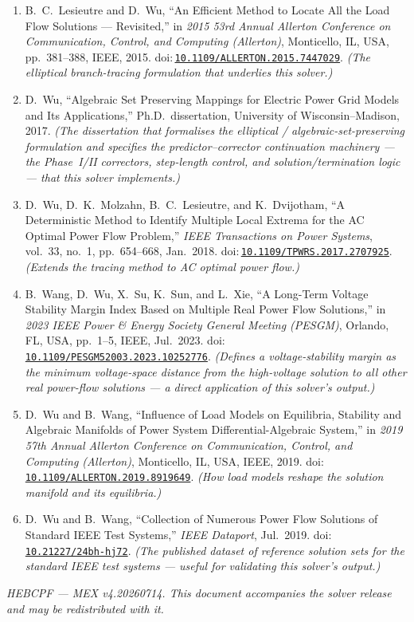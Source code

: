 \documentclass[11pt,a4paper]{article}
\newcommand{\doi}[1]{\href{https://doi.org/#1}{\nolinkurl{#1}}}
\begin{document}
\begin{enumerate}[leftmargin=1.6em]
\item B.\ C.\ Lesieutre and D.\ Wu, ``An Efficient Method to Locate All the Load Flow
      Solutions --- Revisited,'' in \emph{2015 53rd Annual Allerton Conference on
      Communication, Control, and Computing (Allerton)}, Monticello, IL, USA, pp.~381--388,
      IEEE, 2015. doi:\,\doi{10.1109/ALLERTON.2015.7447029}. \emph{(The elliptical
      branch-tracing formulation that underlies this solver.)}
\item D.\ Wu, ``Algebraic Set Preserving Mappings for Electric Power Grid Models and Its
      Applications,'' Ph.D.\ dissertation, University of Wisconsin--Madison, 2017.
      \emph{(The dissertation that formalises the elliptical / algebraic-set-preserving
      formulation and specifies the predictor--corrector continuation machinery --- the
      Phase~I/II correctors, step-length control, and solution/termination logic --- that
      this solver implements.)}
\item D.\ Wu, D.\ K.\ Molzahn, B.\ C.\ Lesieutre, and K.\ Dvijotham, ``A Deterministic
      Method to Identify Multiple Local Extrema for the AC Optimal Power Flow Problem,''
      \emph{IEEE Transactions on Power Systems}, vol.~33, no.~1, pp.~654--668, Jan.\ 2018.
      doi:\,\doi{10.1109/TPWRS.2017.2707925}.
      \emph{(Extends the tracing method to AC optimal power flow.)}
\item B.\ Wang, D.\ Wu, X.\ Su, K.\ Sun, and L.\ Xie, ``A Long-Term Voltage Stability
      Margin Index Based on Multiple Real Power Flow Solutions,'' in \emph{2023 IEEE Power
      \& Energy Society General Meeting (PESGM)}, Orlando, FL, USA, pp.~1--5, IEEE,
      Jul.\ 2023. doi:\,\doi{10.1109/PESGM52003.2023.10252776}.
      \emph{(Defines a voltage-stability margin as the
      minimum voltage-space distance from the high-voltage solution to all other real
      power-flow solutions --- a direct application of this solver's output.)}
\item D.\ Wu and B.\ Wang, ``Influence of Load Models on Equilibria, Stability and
      Algebraic Manifolds of Power System Differential-Algebraic System,'' in \emph{2019
      57th Annual Allerton Conference on Communication, Control, and Computing
      (Allerton)}, Monticello, IL, USA, IEEE, 2019.
      doi:\,\doi{10.1109/ALLERTON.2019.8919649}. \emph{(How load models reshape the
      solution manifold and its equilibria.)}
\item D.\ Wu and B.\ Wang, ``Collection of Numerous Power Flow Solutions of Standard IEEE
      Test Systems,'' \emph{IEEE Dataport}, Jul.\ 2019.
      doi:\,\doi{10.21227/24bh-hj72}. \emph{(The published dataset of reference solution
      sets for the standard IEEE test systems --- useful for validating this solver's
      output.)}
\end{enumerate}

\vfill
\begin{center}\small\itshape
HEBCPF --- MEX v4.20260714. This document accompanies the solver release and may be
redistributed with it.
\end{center}
\end{document}
